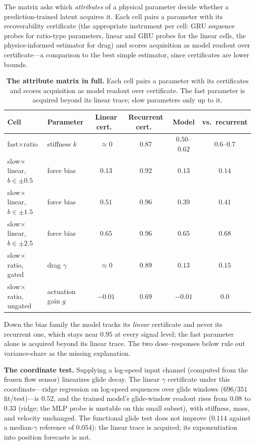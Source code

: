 \documentclass{article} %
\begin{document}
The matrix asks which \emph{attributes} of a physical parameter decide
whether a prediction-trained latent acquires it. Each cell pairs a parameter
with its recoverability certificate (the appropriate instrument per cell:
GRU sequence probes for ratio-type parameters, linear and GRU probes for the
linear cells, the physics-informed estimator for drag) and scores
acquisition as model readout over certificate---a comparison to the best
simple estimator, since certificates are lower bounds.

\begin{table}[H]
\caption{\textbf{The attribute matrix in full.} Each cell pairs a parameter with its certificates and scores acquisition as model readout over certificate. The fast parameter is acquired beyond its linear trace; slow parameters only up to it.}
\label{tab:matrixfull}
\begin{center}
\small
\begin{tabular}{llcccc}
\toprule
\rowcolor{tabhead} Cell & Parameter & Linear cert.\ & Recurrent cert.\ & Model & vs.\ recurrent \\
\midrule
fast$\times$ratio & stiffness $k$ & ${\approx}0$ & $0.87$ & $0.50$--$0.62$ & $0.6$--$0.7$ \\
slow$\times$linear, $b \in \pm 0.5$ & force bias & $0.13$ & $0.92$ & $0.13$ & $0.14$ \\
slow$\times$linear, $b \in \pm 1.5$ & force bias & $0.51$ & $0.96$ & $0.39$ & $0.41$ \\
slow$\times$linear, $b \in \pm 2.5$ & force bias & $0.65$ & $0.96$ & $0.65$ & $0.68$ \\
slow$\times$ratio, gated & drag $\gamma$ & ${\approx}0$ & $0.89$ & $0.13$ & $0.15$ \\
slow$\times$ratio, ungated & actuation gain $g$ & $-0.01$ & $0.69$ & $-0.01$ & $\mathbf{0.0}$ \\
\bottomrule
\end{tabular}
\end{center}
\end{table}

Down the bias family the model tracks its \emph{linear} certificate and
never its recurrent one, which stays near $0.95$ at every signal level; the
fast parameter alone is acquired beyond its linear trace. The two
dose--responses below rule out variance-share as the missing explanation.

\textbf{The coordinate test.} Supplying a log-speed input channel (computed
from the frozen flow sensor) linearizes glide decay. The linear $\gamma$
certificate under this coordinate---ridge regression on log-speed sequences
over glide windows ($696/351$ fit/test)---is $0.52$, and the trained model's
glide-window readout rises from $0.08$ to $0.33$ (ridge; the MLP probe is
unstable on this small subset), with stiffness, mass, and velocity
unchanged. The functional glide test does not improve ($0.114$ against a
median-$\gamma$ reference of $0.054$): the linear trace is acquired; its
exponentiation into position forecasts is not.
\end{document}
